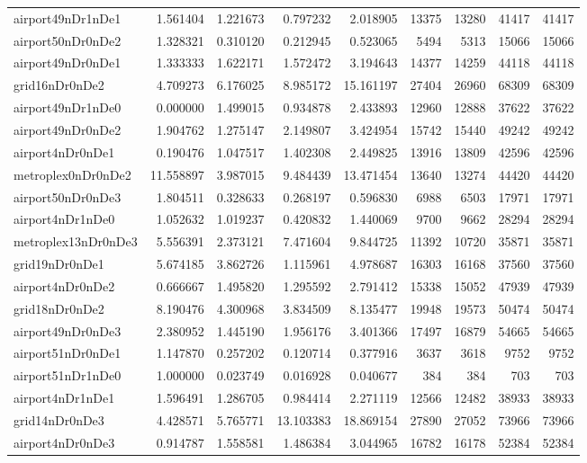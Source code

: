 \begin{longtable}{|l|r|r|r|r|r|r|r|r|}
airport49nDr1nDe1 & 1.561404 & 1.221673 & 0.797232 & 2.018905 & 13375 & 13280 & 41417 & 41417 \\
airport50nDr0nDe2 & 1.328321 & 0.310120 & 0.212945 & 0.523065 & 5494 & 5313 & 15066 & 15066 \\
airport49nDr0nDe1 & 1.333333 & 1.622171 & 1.572472 & 3.194643 & 14377 & 14259 & 44118 & 44118 \\
grid16nDr0nDe2 & 4.709273 & 6.176025 & 8.985172 & 15.161197 & 27404 & 26960 & 68309 & 68309 \\
airport49nDr1nDe0 & 0.000000 & 1.499015 & 0.934878 & 2.433893 & 12960 & 12888 & 37622 & 37622 \\
airport49nDr0nDe2 & 1.904762 & 1.275147 & 2.149807 & 3.424954 & 15742 & 15440 & 49242 & 49242 \\
airport4nDr0nDe1 & 0.190476 & 1.047517 & 1.402308 & 2.449825 & 13916 & 13809 & 42596 & 42596 \\
metroplex0nDr0nDe2 & 11.558897 & 3.987015 & 9.484439 & 13.471454 & 13640 & 13274 & 44420 & 44420 \\
airport50nDr0nDe3 & 1.804511 & 0.328633 & 0.268197 & 0.596830 & 6988 & 6503 & 17971 & 17971 \\
airport4nDr1nDe0 & 1.052632 & 1.019237 & 0.420832 & 1.440069 & 9700 & 9662 & 28294 & 28294 \\
metroplex13nDr0nDe3 & 5.556391 & 2.373121 & 7.471604 & 9.844725 & 11392 & 10720 & 35871 & 35871 \\
grid19nDr0nDe1 & 5.674185 & 3.862726 & 1.115961 & 4.978687 & 16303 & 16168 & 37560 & 37560 \\
airport4nDr0nDe2 & 0.666667 & 1.495820 & 1.295592 & 2.791412 & 15338 & 15052 & 47939 & 47939 \\
grid18nDr0nDe2 & 8.190476 & 4.300968 & 3.834509 & 8.135477 & 19948 & 19573 & 50474 & 50474 \\
airport49nDr0nDe3 & 2.380952 & 1.445190 & 1.956176 & 3.401366 & 17497 & 16879 & 54665 & 54665 \\
airport51nDr0nDe1 & 1.147870 & 0.257202 & 0.120714 & 0.377916 & 3637 & 3618 & 9752 & 9752 \\
airport51nDr1nDe0 & 1.000000 & 0.023749 & 0.016928 & 0.040677 & 384 & 384 & 703 & 703 \\
airport4nDr1nDe1 & 1.596491 & 1.286705 & 0.984414 & 2.271119 & 12566 & 12482 & 38933 & 38933 \\
grid14nDr0nDe3 & 4.428571 & 5.765771 & 13.103383 & 18.869154 & 27890 & 27052 & 73966 & 73966 \\
airport4nDr0nDe3 & 0.914787 & 1.558581 & 1.486384 & 3.044965 & 16782 & 16178 & 52384 & 52384 \\

\end{longtable}
